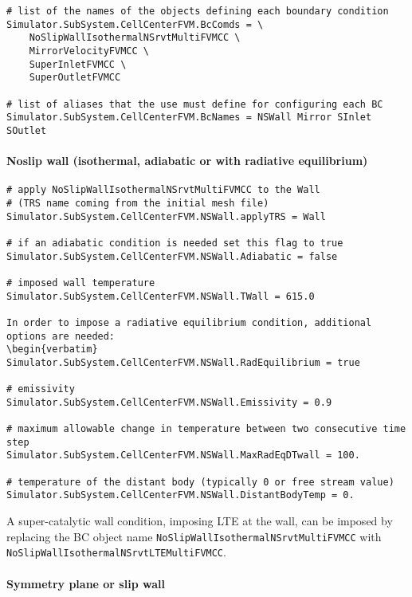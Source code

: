 \documentclass[11pt]{article}
\begin{document}
\begin{verbatim}
# list of the names of the objects defining each boundary condition
Simulator.SubSystem.CellCenterFVM.BcComds = \
    NoSlipWallIsothermalNSrvtMultiFVMCC \
    MirrorVelocityFVMCC \
    SuperInletFVMCC \
    SuperOutletFVMCC

# list of aliases that the use must define for configuring each BC
Simulator.SubSystem.CellCenterFVM.BcNames = NSWall Mirror SInlet SOutlet
\end{verbatim}

\paragraph{Noslip wall (isothermal, adiabatic or with radiative equilibrium)}

\begin{verbatim}
# apply NoSlipWallIsothermalNSrvtMultiFVMCC to the Wall
# (TRS name coming from the initial mesh file)
Simulator.SubSystem.CellCenterFVM.NSWall.applyTRS = Wall

# if an adiabatic condition is needed set this flag to true
Simulator.SubSystem.CellCenterFVM.NSWall.Adiabatic = false

# imposed wall temperature
Simulator.SubSystem.CellCenterFVM.NSWall.TWall = 615.0

In order to impose a radiative equilibrium condition, additional options are needed:
\begin{verbatim}
Simulator.SubSystem.CellCenterFVM.NSWall.RadEquilibrium = true

# emissivity
Simulator.SubSystem.CellCenterFVM.NSWall.Emissivity = 0.9

# maximum allowable change in temperature between two consecutive time step
Simulator.SubSystem.CellCenterFVM.NSWall.MaxRadEqDTwall = 100.

# temperature of the distant body (typically 0 or free stream value)
Simulator.SubSystem.CellCenterFVM.NSWall.DistantBodyTemp = 0.
\end{verbatim}

A super-catalytic wall condition, imposing LTE at the wall, can be imposed by replacing 
the BC object name {\tt NoSlipWallIsothermalNSrvtMultiFVMCC} with 
{\tt NoSlipWallIsothermalNSrvtLTEMultiFVMCC}. 

\paragraph{Symmetry plane or slip wall}
\end{document}
